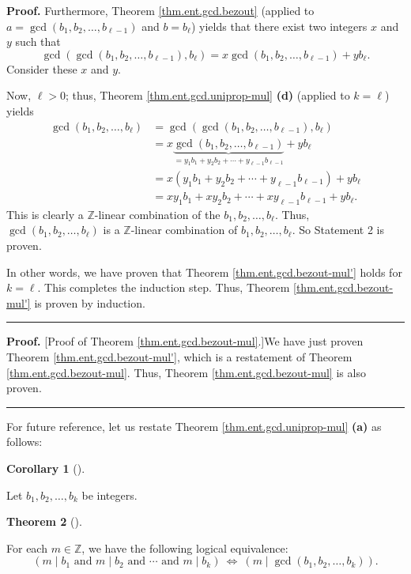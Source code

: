 \documentclass[numbers=enddot,12pt,final,onecolumn,notitlepage]{scrartcl}%
\numberwithin{exer}{subsection}
\theoremstyle{definition}
\newtheorem{theo}{Theorem}[subsection]
\newenvironment{theorem}[1][]
{\begin{theo}[#1]\begin{leftbar}}
{\end{leftbar}\end{theo}}
\newtheorem{coro}[theo]{Corollary}
\newenvironment{corollary}[1][]
{\begin{coro}[#1]\begin{leftbar}}
{\end{leftbar}\end{coro}}
\newenvironment{proof}[1][Proof]{\noindent\textbf{#1.} }{\ \rule{0.5em}{0.5em}}
\begin{document}
\begin{proof}
Furthermore, Theorem \ref{thm.ent.gcd.bezout} (applied to $a=\gcd\left(
b_{1},b_{2},\ldots,b_{\ell-1}\right)  $ and $b=b_{\ell}$) yields that there
exist two integers $x$ and $y$ such that%
\[
\gcd\left(  \gcd\left(  b_{1},b_{2},\ldots,b_{\ell-1}\right)  ,b_{\ell
}\right)  =x\gcd\left(  b_{1},b_{2},\ldots,b_{\ell-1}\right)  +yb_{\ell}.
\]
Consider these $x$ and $y$.

Now, $\ell>0$; thus, Theorem \ref{thm.ent.gcd.uniprop-mul} \textbf{(d)}
(applied to $k=\ell$) yields%
\begin{align*}
\gcd\left(  b_{1},b_{2},\ldots,b_{\ell}\right)   &  =\gcd\left(  \gcd\left(
b_{1},b_{2},\ldots,b_{\ell-1}\right)  ,b_{\ell}\right) \\
&  =x\underbrace{\gcd\left(  b_{1},b_{2},\ldots,b_{\ell-1}\right)  }%
_{=y_{1}b_{1}+y_{2}b_{2}+\cdots+y_{\ell-1}b_{\ell-1}}+yb_{\ell}\\
&  =x\left(  y_{1}b_{1}+y_{2}b_{2}+\cdots+y_{\ell-1}b_{\ell-1}\right)
+yb_{\ell}\\
&  =xy_{1}b_{1}+xy_{2}b_{2}+\cdots+xy_{\ell-1}b_{\ell-1}+yb_{\ell}.
\end{align*}
This is clearly a $\mathbb{Z}$-linear combination of the $b_{1},b_{2}%
,\ldots,b_{\ell}$. Thus, $\gcd\left(  b_{1},b_{2},\ldots,b_{\ell}\right)  $ is
a $\mathbb{Z}$-linear combination of $b_{1},b_{2},\ldots,b_{\ell}$. So
Statement 2 is proven.

In other words, we have proven that Theorem \ref{thm.ent.gcd.bezout-mul'}
holds for $k=\ell$. This completes the induction step. Thus, Theorem
\ref{thm.ent.gcd.bezout-mul'} is proven by induction.
\end{proof}

\begin{proof}
[Proof of Theorem \ref{thm.ent.gcd.bezout-mul}.]We have just proven Theorem
\ref{thm.ent.gcd.bezout-mul'}, which is a restatement of Theorem
\ref{thm.ent.gcd.bezout-mul}. Thus, Theorem \ref{thm.ent.gcd.bezout-mul} is
also proven.
\end{proof}

For future reference, let us restate Theorem \ref{thm.ent.gcd.uniprop-mul}
\textbf{(a)} as follows:

\begin{corollary}
\label{cor.ent.gcd.uniprop-mula}Let $b_{1},b_{2},\ldots,b_{k}$ be integers.
\end{corollary}

\begin{theorem}
For each $m\in\mathbb{Z}$, we have the following logical equivalence:%
\[
\left(  m\mid b_{1}\text{ and }m\mid b_{2}\text{ and }\cdots\text{ and }m\mid
b_{k}\right)  \ \Longleftrightarrow\ \left(  m\mid\gcd\left(  b_{1}%
,b_{2},\ldots,b_{k}\right)  \right)  .
\]

\end{theorem}
\end{document}
